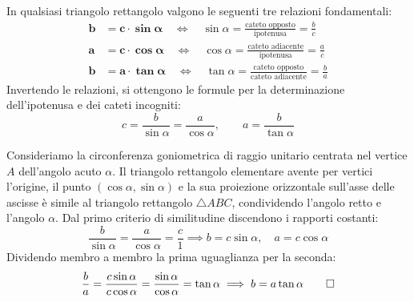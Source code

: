 \documentclass[11pt,a4paper,oneside]{report}
\begin{document}
\begin{teorema}
In qualsiasi triangolo rettangolo valgono le seguenti tre relazioni fondamentali:
\begin{align}
    \mathbf{b} &= \mathbf{c \cdot \sin\alpha} \quad \iff \quad \sin\alpha = \frac{\text{cateto opposto}}{\text{ipotenusa}} = \frac{b}{c} \\
    \mathbf{a} &= \mathbf{c \cdot \cos\alpha} \quad \iff \quad \cos\alpha = \frac{\text{cateto adiacente}}{\text{ipotenusa}} = \frac{a}{c} \\
    \mathbf{b} &= \mathbf{a \cdot \tan\alpha} \quad \iff \quad \tan\alpha = \frac{\text{cateto opposto}}{\text{cateto adiacente}} = \frac{b}{a}
\end{align}
Invertendo le relazioni, si ottengono le formule per la determinazione dell'ipotenusa e dei cateti incogniti:
\begin{equation}
    c = \frac{b}{\sin\alpha} = \frac{a}{\cos\alpha}, \qquad a = \frac{b}{\tan\alpha}
\end{equation}
\end{teorema}

\begin{dimostrazione}
Consideriamo la circonferenza goniometrica di raggio unitario centrata nel vertice $A$ dell'angolo acuto $\alpha$.
Il triangolo rettangolo elementare avente per vertici l'origine, il punto $(\cos\alpha, \sin\alpha)$ e la sua proiezione orizzontale sull'asse delle ascisse è simile al triangolo rettangolo $\triangle ABC$, condividendo l'angolo retto e l'angolo $\alpha$.
Dal primo criterio di similitudine discendono i rapporti costanti:
\begin{equation*}
    \frac{b}{\sin\alpha} = \frac{a}{\cos\alpha} = \frac{c}{1} \implies b = c\sin\alpha, \quad a = c\cos\alpha
\end{equation*}
Dividendo membro a membro la prima uguaglianza per la seconda:
\begin{equation*}
    \frac{b}{a} = \frac{c\sin\alpha}{c\cos\alpha} = \frac{\sin\alpha}{\cos\alpha} = \tan\alpha \implies b = a\tan\alpha \qedhere
\end{equation*}
\end{dimostrazione}
\end{document}
